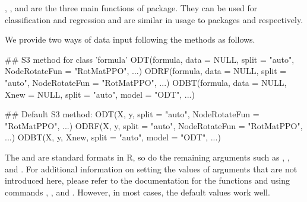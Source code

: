 , , and  are the three main functions of   package. They can be used for classification and regression and are similar in usage to packages  and  respectively. 

We provide two ways of data input following the  methods as follows.
\begin{example}
## S3 method for class 'formula'
ODT(formula, data = NULL, split = "auto", NodeRotateFun = "RotMatPPO", ...)
ODRF(formula, data = NULL, split = "auto", NodeRotateFun = "RotMatPPO", ...)
ODBT(formula, data = NULL, Xnew = NULL, split = "auto", model = "ODT", ...)
\end{example}
\begin{example}
## Default S3 method:
ODT(X, y, split = "auto", NodeRotateFun = "RotMatPPO", ...)
ODRF(X, y, split = "auto", NodeRotateFun = "RotMatPPO", ...)
ODBT(X, y, Xnew, split = "auto", model = "ODT", ...)
\end{example}
The  and  are standard formats  in {R}, so do the remaining arguments such as , , and .
For additional information on setting the values of arguments that are not introduced here, please refer to the documentation for the functions  and  using commands , , and . However, in most cases, the default values work well.

